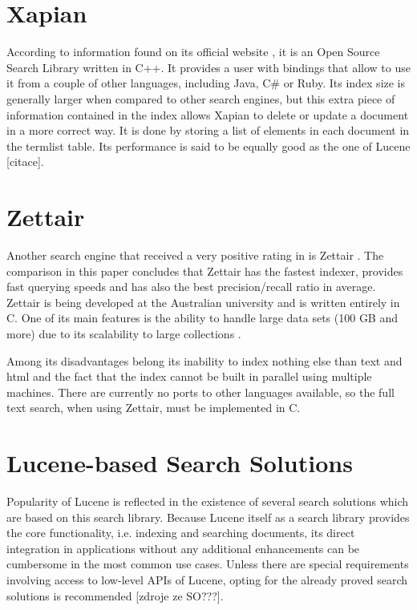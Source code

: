 \section{Xapian}

According to information found on its official website \cite{XapianHome},
it is an Open Source Search Library written in C++. 
It provides a user with bindings that allow to use it from a couple of other languages,
including Java, C\# or Ruby. 
Its index size is generally larger when compared to other search engines, but this extra piece of information contained in the index allows Xapian to delete or update a document in a more correct way. 
It is done by storing a list of elements in each document in the termlist table\cite{XapianIndexSize}. 
Its performance is said to be equally good as the one of Lucene {[}citace{]}.


\section{Zettair}

Another search engine that received a very positive rating in \cite{MiddletonBaeza} is Zettair \cite{ZettairHome}. 
The comparison in this paper concludes that Zettair has the fastest indexer, provides fast querying speeds and has also the best precision/recall ratio in average. 
Zettair is being developed at the Australian university and is written entirely
in C. 
One of its main features is the ability to handle large data
sets (100 GB and more) due to its scalability to large collections \cite{ZettairHome}.

Among its disadvantages belong its inability to index nothing else than text and html and the fact that the index cannot be built in
parallel using multiple machines. 
There are currently no ports to other languages available, so the full text search, when using Zettair, must be implemented in C.


\section{Lucene-based Search Solutions}

Popularity of Lucene is reflected in the existence of several search solutions which are based on this search library.
Because Lucene itself as a search library provides the core functionality, i.e. indexing and searching documents, its direct integration in applications without any additional enhancements can be cumbersome in the most common use cases.
Unless there are special requirements involving access to low-level APIs of Lucene, opting for the already proved search solutions is recommended [zdroje ze SO???].

